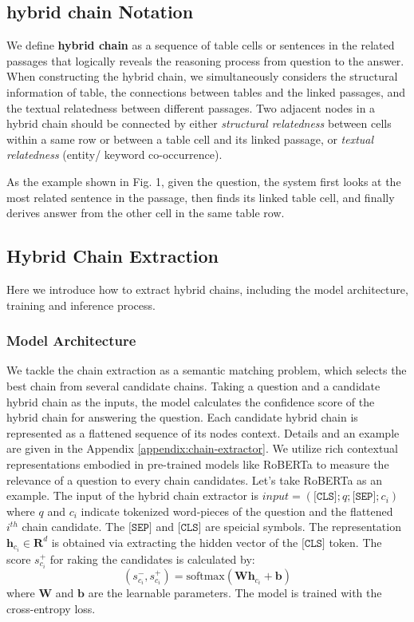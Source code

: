 \documentclass[11pt]{article}
\newcommand{\softmax}{\mathrm{softmax}}
\begin{document}
	\subsection{hybrid chain Notation}
We define \textbf{hybrid chain} as a sequence of table cells or sentences in the related passages that logically reveals the reasoning process from question to the answer. 
	When constructing the hybrid chain, we simultaneously considers the structural information of table, the connections between tables and the linked passages, and the textual relatedness between different passages.
	Two adjacent nodes in a hybrid chain should be connected by either \textit{structural relatedness} between cells within a same row or between a table cell and its linked passage, or \textit{textual relatedness} (entity/ keyword co-occurrence). 
	
As the example shown in Fig. 1, given the question, the system first looks at the most related sentence in the passage, then finds its linked table cell, and finally derives answer from the other cell in the same table row.
	
	\fi
	
	\subsection{Hybrid Chain Extraction}\label{sec:ec-extractor}
	Here we introduce how to extract hybrid chains, including the model architecture, training and inference process.
\subsubsection{Model Architecture}
	We tackle the chain extraction as a semantic matching problem, which selects the best chain from several candidate chains.
Taking a question and a candidate hybrid chain as the inputs, the model calculates the confidence score of the hybrid chain for answering the question. 
	Each candidate hybrid chain is represented as a flattened sequence of its nodes context. Details and an example are given in the Appendix \ref{appendix:chain-extractor}. 
We utilize rich contextual representations embodied in pre-trained models like RoBERTa \cite{Liu2019RoBERTaAR} to measure the relevance of a question to every chain candidates. 
	Let's take RoBERTa as an example. The input of the hybrid chain extractor is $input = (\texttt{[CLS]}; q;  \texttt{[SEP]}; c_i)$
	where $q$ and $c_i$ indicate tokenized word-pieces of the question and the flattened $i^{th}$  chain candidate. 
	The $\texttt{[SEP]}$ and $\texttt{[CLS]}$ are speicial symbols. The representation $\bm{h}_{c_i}\in\mathbf{R}^d$ is obtained via extracting the hidden vector of the $\texttt{[CLS]}$ token. 
	The score $s^{+}_{c_i}$ for raking the candidates is calculated by:
	\begin{equation}
		(s^{-}_{c_i},s^{+}_{c_i}) = \softmax(\bm{W}\bm{h}_{c_i}+\bm{b})
	\end{equation}
	where $\bm{W}$ and $\bm{b}$ are the learnable parameters.
The model is trained with the cross-entropy loss.
\end{document}
